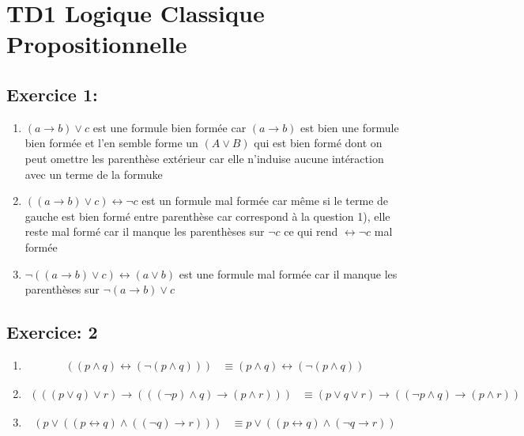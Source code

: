 \documentclass[12pt]{report}
\begin{document}
\chapter{TD1 Logique Classique Propositionnelle}

\section{Exercice 1:}

\begin{enumerate}
  \item $(a \to b) \vee c$ est une formule bien formée car $(a \to b)$ est bien une formule bien formée et l'en semble forme un $(A \vee B)$ qui est bien formé dont on peut omettre les parenthèse extérieur car elle n'induise aucune intéraction avec un terme de la formuke

  \item $((a \to b) \vee c) \leftrightarrow \neg c$ est un formule mal formée car même si le terme de gauche est bien formé entre parenthèse car correspond à la question 1), elle reste mal formé car il manque les parenthèses sur $\neg c$ ce qui rend  $\leftrightarrow \neg c$ mal formée

  \item $\neg((a \to b) \vee c) \leftrightarrow ( a \vee b)$ est une formule mal formée car il manque les parenthèses sur $\neg (a \to b) \vee c$
\end{enumerate}

\section{Exercice: 2}

\begin{enumerate}
  \item \begin{align*}
            ((p \wedge q) \leftrightarrow (\neg(p \wedge q))) &\equiv (p \wedge q) \leftrightarrow (\neg(p \wedge q))
        \end{align*}
  \item \begin{align*}
           (((p \vee q)\vee r)\to (((\neg p)\wedge q)\to (p \wedge r))) &\equiv
            (p \vee q \vee r) \to ( ( \neg p \wedge q)\to (p \wedge r) )
        \end{align*}
  \item \begin{align*}
              (p \vee ((p \leftrightarrow q) \wedge ((\neg q) \to r))) & \equiv
              p \vee ( (p \leftrightarrow q) \wedge (\neg q \to r))
        \end{align*}
\end{enumerate}
\end{document}
